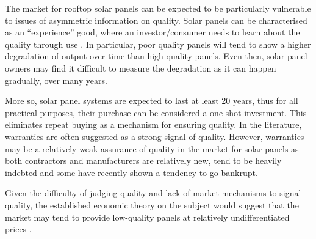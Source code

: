 \documentclass[a4paper]{article}
\begin{document}


The market for rooftop solar panels can be expected to be particularly vulnerable to issues of asymmetric information on quality. Solar panels can be characterised as an ``experience'' good, where an investor/consumer needs to learn about the quality through use \citep{caulkins_interaction_2017}. In particular, poor quality panels will tend to show a higher degradation of output over time than high quality panels. Even then, solar panel owners may find it difficult to measure the degradation as it can happen gradually, over many years.

More so, solar panel systems are expected to last at least 20 years, thus for all practical purposes, their purchase can be considered a one-shot investment. This eliminates repeat buying as a mechanism for ensuring quality. In the literature, warranties are often suggested as a strong signal of quality. However, warranties may be a relatively weak assurance of quality in the market for solar panels as both contractors and manufacturers are relatively new, tend to be heavily indebted and some have recently shown a tendency to go bankrupt.

Given the difficulty of judging quality and lack of market mechanisms to signal quality, the established economic theory on the subject would suggest that the market may tend to provide low-quality panels at relatively undifferentiated prices \citep{tirole_theory_1988}.
\end{document}
